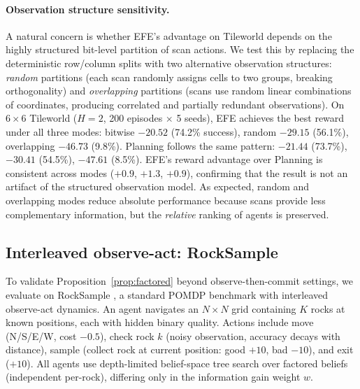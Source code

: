 \documentclass[runningheads]{llncs}
\begin{document}
\paragraph{Observation structure sensitivity.} A natural concern is whether EFE's advantage on Tileworld depends on the highly structured bit-level partition of scan actions. We test this by replacing the deterministic row/column splits with two alternative observation structures: \emph{random} partitions (each scan randomly assigns cells to two groups, breaking orthogonality) and \emph{overlapping} partitions (scans use random linear combinations of coordinates, producing correlated and partially redundant observations). On $6{\times}6$ Tileworld ($H{=}2$, 200 episodes $\times$ 5 seeds), EFE achieves the best reward under all three modes: bitwise $-20.52$ (74.2\% success), random $-29.15$ (56.1\%), overlapping $-46.73$ (9.8\%). Planning follows the same pattern: $-21.44$ (73.7\%), $-30.41$ (54.5\%), $-47.61$ (8.5\%). EFE's reward advantage over Planning is consistent across modes ($+0.9$, $+1.3$, $+0.9$), confirming that the result is not an artifact of the structured observation model. As expected, random and overlapping modes reduce absolute performance because scans provide less complementary information, but the \emph{relative} ranking of agents is preserved.

\subsection{Interleaved observe-act: RockSample}
\label{sec:rocksample}

To validate Proposition~\ref{prop:factored} beyond observe-then-commit settings, we evaluate on RockSample \citep{smith2004}, a standard POMDP benchmark with interleaved observe-act dynamics. An agent navigates an $N{\times}N$ grid containing $K$ rocks at known positions, each with hidden binary quality. Actions include move (N/S/E/W, cost $-0.5$), check rock $k$ (noisy observation, accuracy decays with distance), sample (collect rock at current position: good $+10$, bad $-10$), and exit ($+10$). All agents use depth-limited belief-space tree search over factored beliefs (independent per-rock), differing only in the information gain weight $w$.
\end{document}
